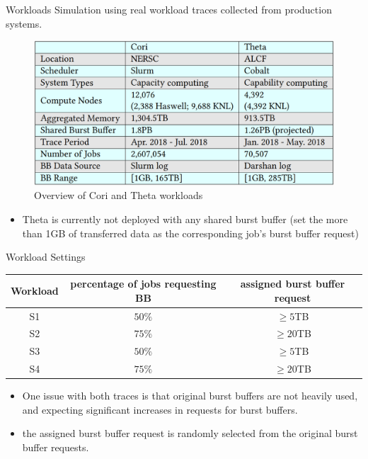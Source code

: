 \documentclass[aspectratio=1610]{beamer}
\begin{document}
\begin{frame}{Workloads}
    Simulation using real workload traces collected from production systems.
    \begin{figure}
        \centering
        \includegraphics[scale=0.4]{pic/workload.png}
        \caption{Overview of Cori and Theta workloads}
        \label{fig:workload}
    \end{figure}
    \begin{itemize}
    \item Theta is currently not deployed with any shared burst buffer (set the more than 1GB of transferred data as the corresponding job’s burst buffer request)
\end{itemize}
\end{frame}

\begin{frame}{Workload Settings}
\begin{table}[]
\begin{tabular}{|c|c|c|}
\hline
Workload & percentage of jobs requesting BB & assigned burst buffer request \\ \hline
S1       & $50\%$                           & $\geq 5$TB                    \\ \hline
S2       & $75\%$                           & $\geq 20$TB                   \\ \hline
S3       & $50\%$                           & $\geq 5$TB                    \\ \hline
S4       & $75\%$                           & $\geq 20$TB                   \\ \hline
\end{tabular}
\end{table}
\begin{itemize}
    \item One issue with both traces is that original burst buffers are not heavily used, and expecting significant increases in requests for burst buffers.
    \item the assigned burst buffer request is randomly selected from the original burst buffer requests.
    
\end{itemize}
\end{frame}
\end{document}
